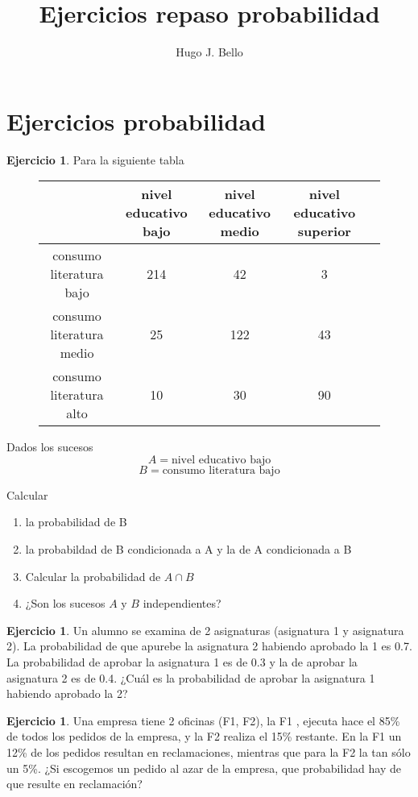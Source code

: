 \documentclass[]{article}
\title{Ejercicios repaso probabilidad}
\author{Hugo J. Bello}
\date{}
\theoremstyle{plain}
\theoremstyle{definition}
\newtheorem{exercise}[theorem]{Ejercicio}
\theoremstyle{definition} %
\begin{document}
\maketitle
\section{Ejercicios probabilidad}



\begin{exercise}
  Para la siguiente tabla
  \begin{figure}
    \centering
    \begin{tabular}{c|ccc|c}
                         &nivel educativo bajo&nivel educativo medio&nivel educativo superior \\
       \hline
       consumo literatura bajo         &214          &42                &3                    \\
       consumo literatura medio        &25           &122               &43                   \\
       consumo literatura alto         &10            &30                &90                  \\
      \end{tabular}
  \end{figure}

  Dados los sucesos
  \[A=\text{nivel educativo bajo}\]
  \[B=\text{consumo literatura bajo}\]

  Calcular 
  \begin{enumerate}
    \item la probabilidad de B
    \item la probabildad de B condicionada a A y la de A condicionada a B
    \item Calcular la probabilidad de $A\cap B$
    \item  ¿Son los sucesos $A$ y $B$ independientes?

  \end{enumerate}
\end{exercise}

\begin{exercise}
  Un alumno se examina de 2 asignaturas (asignatura 1 y asignatura 2). 
  La probabilidad de que apurebe la asignatura 2 habiendo aprobado la 1 es 0.7. La probabilidad de aprobar 
  la asignatura 1 es de 0.3 y la de aprobar la asignatura 2 es de 0.4. 
  ¿Cuál es la probabilidad de aprobar la asignatura 1 habiendo aprobado la 2?
\end{exercise}


\begin{exercise}
  Una empresa tiene 2 oficinas (F1, F2), la F1 , ejecuta
  hace el 85\% de todos los pedidos de la empresa, y la F2 realiza el 
  15\% restante. En la F1 un 12\% de los pedidos resultan en reclamaciones, mientras que para la F2 la tan sólo un 5\%.
  ¿Si escogemos un pedido al azar de la empresa, que probabilidad hay de que resulte en reclamación?
\end{exercise}
\end{document}
